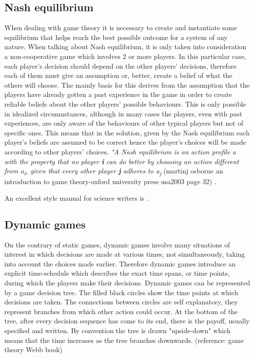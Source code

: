 \documentclass[conference]{IEEEtran}
\begin{document}
\subsection{Nash equilibrium}
When dealing with game theory it is necessary to create and instantiate some equilibrium that helps reach the best possible outcome for a system of any nature. When talking about Nash equilibrium, it is only taken into consideration a non-cooperative game which involves 2 or more players. In this particular case, each player's decision should depend on the other players' decisions, therefore each of them must give an assumption or, better, create a belief of what the others will choose. The mainly basis for this derives from the assumption that the players have already gotten a past experience in the game in order to create reliable beliefs about the other players' possible behaviours.
This is only possible in idealized circumnstances, although in many cases the players, even with past experiences, are only aware of the behaviours of other typical players but not of specific ones. This means that in the solution, given by the Nash equilibrium each player's beliefs are assumed to be correct hence the player's choices will be made according to other players' choices. 
\textit{"A Nash equilibrium is an action profile a\textsuperscript{\text{*}} with the property that no player \textbf{i} can do better by choosing an action different from a\textsuperscript{\text{*}}\textsubscript{i}, given that every other player \textbf{j} adheres to a\textsuperscript{\text{*}}\textsubscript{j} }
(martinj osborne an introduction to game theory-oxford university press usa2003 page 32) .

An excellent style manual for science writers is \cite{b7}.

\subsection{Dynamic games}
On the contrary of static games, dynamic games involve many situations of interest in which decisions are
made at various times, not simultaneously, taking into account the choices made earlier. Therefore dynamic games introduce an explicit time-schedule which describes the exact time spans, or time points, during which the players make their decisions.
Dynamic games can be represented by a game decision tree. The filled black circles show the time points at which decisions are taken. The connections between circles are self explanatory, they represent branches from which other action could occur. At the bottom of the tree, after every decision sequence has come to its end, there is the payoff, usually specified and written. By convention the tree is drawn "upside-down" which means that the time increases as the tree branches downwards. (reference: game theory Webb book)
\end{document}
